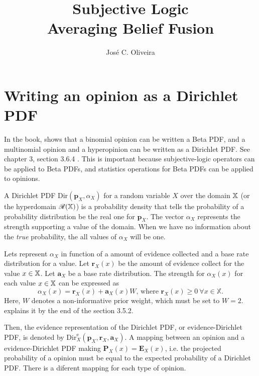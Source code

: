 \documentclass[a4paper,12pt]{article}
\title{Subjective Logic\\
\large{Averaging Belief Fusion}}
\author{José C. Oliveira}
\theoremstyle{definition}
\theoremstyle{theorem}
\numberwithin{equation}{section}
\begin{document}
\maketitle

\section{Writing an opinion as a Dirichlet PDF}

In the book, \citeauthor{josang2016subjective} shows that a binomial opinion can be written a Beta PDF, and a multinomial opinion and a hyperopinion can be written as a Dirichlet PDF. See chapter 3, section 3.6.4 \cite{josang2016subjective}. This is important because subjective-logic operators can be applied to Beta PDFs, and statistics operations for Beta PDFs can be applied to opinions.

A Dirichlet PDF $\mathrm{Dir}(\mathbf{p}_X, \alpha_X)$ for a random variable $X$ over the domain $\mathbb{X}$ (or the hyperdomain $\mathcal{R}(\mathbb{X})$) is a probability density that tells the probability of a probability distribution be the real one for $\mathbf{p}_X$. The vector $\alpha_X$ represents the strength supporting a value of the domain. When we have no information about the \emph{true} probability, the all values of $\alpha_X$ will be one.

Lets represent $\alpha_X$ in function of a amount of evidence collected and a base rate distribution for a value. Let $\mathbf{r}_X(x)$ be the amount of evidence collect for the value $x \in \mathbb{X}$. Let $\mathbf{a}_X$ be a base rate distribution. The strength for $\alpha_X(x)$ for each value $x \in \mathbb{X}$ can be expressed as
\begin{equation}\label{eq:alpha_as_evidence_and_base_rate}
    \alpha_X(x) = \mathbf{r}_X(x) + \mathbf{a}_X(x)W\text{, where }\mathbf{r}_X(x) \geq 0\ \forall x \in \mathbb{X}\text{.}
\end{equation}
Here, $W$ denotes a non-informative prior weight, which must be set to $W = 2$. \citeauthor{josang2016subjective} explains it by the end of the section 3.5.2.

Then, the evidence representation of the Dirichlet PDF, or evidence-Dirichlet PDF, is denoted by $\mathrm{Dir}^{\mathrm{e}}_X(\mathbf{p}_X, \mathbf{r}_X, \mathbf{a}_X)$. A mapping between an opinion and a evidence-Dirichlet PDF making $\mathbf{P}_X(x) = \mathbf{E}_X(x)$, i.e. the projected probability of a opinion must be equal to the expected probability of a Dirichlet PDF. There is a diferent mapping for each type of opinion.
\end{document}
